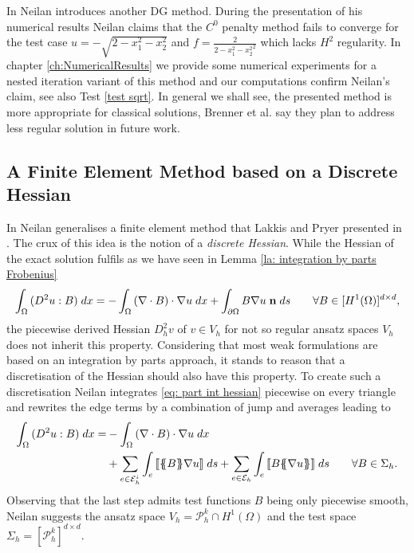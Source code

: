 In \cite{Neilan2014} Neilan introduces another DG method. During the presentation of his numerical results Neilan claims that the $C^0$ penalty method fails to converge for the test case $u = -\sqrt{2 - x_1^2 - x_2^2 }$ and $f = \frac 2 {{2 - x_1^2 - x_2^2}^2}$ which lacks $H^2$ regularity. 
In chapter \ref{ch:NumericalResults} we provide some numerical experiments for a nested iteration variant of this method and our computations confirm Neilan's claim, see also Test \ref{test sqrt}. In general we shall see, the presented method is more appropriate for classical solutions, Brenner et al. say they plan to address less regular solution in future work. 


\subsection{A Finite Element Method based on a Discrete Hessian} \label{subsec: disrete Hessian} \label{sec: FEM discrete Hessian}

In \cite{Neilan2014} Neilan generalises a finite element method that Lakkis and Pryer presented in \cite{LP2011}.
The crux of this idea is the notion of a \emph{discrete Hessian}. 
While the Hessian of the exact solution fulfils as we have seen in Lemma \ref{la: integration by parts Frobenius}
	\begin{align}
		\int_{\Omega} {{ (D^2 u : B)}\;dx} = 
			- \int_{\Omega} {{ \left(\nabla \cdot B\right) \cdot \nabla u}\;dx} 
			+ \int_{\partial \Omega} {{B \nabla u \; \mathbf {n}}\;ds} \qquad \forall B \in [H^1(\Omega)]^{d \times d}, \label{eq: part int hessian}
	\end{align}
the piecewise derived Hessian $D_h^2 v$ of $ v \in V_h$ for not so regular ansatz spaces $V_h$ does not inherit this property. Considering that most weak formulations are based on an integration by parts approach, it stands to reason that a discretisation of the Hessian should also have this property. To create such a discretisation Neilan integrates \eqref{eq: part int hessian} piecewise on every triangle and rewrites the edge terms by a combination of jump and averages leading to
	\begin{align}
		\myIntX  \Omega { (D^2 u : B)}
		=& - \myIntX  \Omega { \left(\nabla \cdot B\right) \cdot \nabla u} \nonumber \\
			&+ \sum_{ e \in \edgesi} \myIntS e { \jump {\average B \nabla u }}
			+ \sum_{ e \in \edges} \myIntS e {  \jump{B \average {\nabla u} }}  \qquad \forall B \in \Sigma_h. \label{eq: part int hessian omega}
	\end{align}
Observing that the last step admits test functions $B$ being only piecewise smooth, Neilan suggests the ansatz space $V_h = \mathcal{P}_h^k \cap H^1(\Omega)$ and the test space $\Sigma_h = [\mathcal{P}_h^k]^{d \times d}$.

